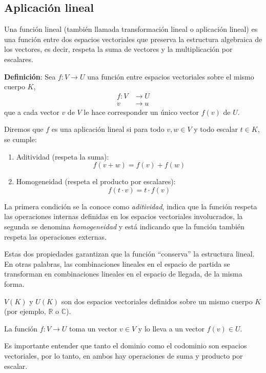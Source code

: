 \subsection{Aplicación lineal}

Una función lineal (también llamada transformación lineal o aplicación lineal) es una función entre dos espacios vectoriales que preserva la estructura algebraica de los vectores, es decir, respeta la suma de vectores y la multiplicación por escalares.

\textbf{Definición}: Sea \(f: V \to U\) una función entre espacios vectoriales sobre el mismo cuerpo \(K\),
\begin{align*}
  f: V &\rightarrow U\\
  v &\rightarrow u
\end{align*}
que a cada vector \(v\) de \(V\) le hace corresponder un único vector \(f(v)\) de \(U\).

Diremos que \(f\) es una aplicación lineal si para todo \(v, w \in V\) y todo escalar \(t \in K\), se cumple:
\begin{enumerate}
  \item Aditividad (respeta la suma):
    \[
     f(v + w) = f(v) + f(w)
    \]
  \item Homogeneidad (respeta el producto por escalares):
    \[
      f(t \cdot v) = t \cdot f(v)
    \]
\end{enumerate}
La primera condición se la conoce como \textit{aditividad}, indica que la función respeta las operaciones internas definidas en los espacios vectoriales involucrados, la segunda se denomina \textit{homogeneidad} y está indicando que la función también respeta las operaciones externas. 

Estas dos propiedades garantizan que la función ``conserva'' la estructura lineal. En otras palabras, las combinaciones lineales en el espacio de partida se transforman en combinaciones lineales en el espacio de llegada, de la misma forma.

\begin{tcolorbox}[remember, title=Aclaración]
  \(V(K)\) y \(U(K)\) son dos espacios vectoriales definidos sobre un mismo cuerpo \(K\) (por ejemplo, \(\mathbb{R}\) o \(\mathbb{C}\)).
  
  La función \(f: V \rightarrow U\) toma un vector \(v \in V\) y lo lleva a un vector \(f(v) \in U\).
  
  Es importante entender que tanto el dominio como el codominio son espacios vectoriales, por lo tanto, en ambos hay operaciones de suma y producto por escalar.
\end{tcolorbox}

